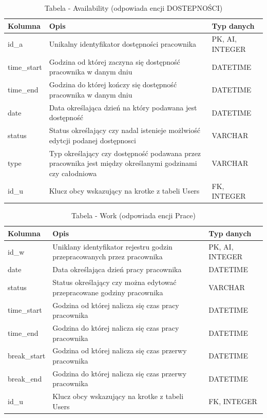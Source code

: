 \begin{table}[h!]
    \centering
    \begin{tabular}{|p{3cm}|p{6cm}|p{4cm}|}
    \hline
    \textbf{Kolumna} & \textbf{Opis} & \textbf{Typ danych} \\ \hline
    id\_a & Unikalny identyfikator dostępności pracownika & PK, AI, INTEGER \\ \hline
    time\_start & Godzina od której zaczyna się dostępność pracownika w danym dniu &  DATETIME\\ \hline
    time\_end & Godzina do której kończy się dostępność pracownika w danym dniu & DATETIME \\ \hline
    date & Data określająca dzień na który podawana jest dostępność  & DATETIME \\ \hline
    status & Status określający czy nadal istenieje możlwiość edytcji podanej dostępnosci & VARCHAR\\ \hline
    type & Typ określający czy dostępność podawana przez pracownika jest między określanymi godzinami czy całodniowa & VARCHAR \\ \hline
    id\_u & Klucz obcy wskazujący na krotke z tabeli Users & FK, INTEGER \\ \hline
    \end{tabular}
    \caption{Tabela - Availability (odpowiada encji DOSTEPNOŚCI)}
\end{table}

\begin{table}[h!]
    \centering
    \begin{tabular}{|p{3cm}|p{6cm}|p{4cm}|}
    \hline
    \textbf{Kolumna} & \textbf{Opis} & \textbf{Typ danych} \\ \hline
    id\_w & Uniklany identyfikator rejestru godzin przepracowanych przez pracownika &PK, AI, INTEGER \\ \hline
    date & Data określająca dzień pracy pracownika & DATETIME\\ \hline
    status & Status określający czy można edytować przepracowane godziny pracownika & VARCHAR\\ \hline
    time\_start & Godzina od której nalicza się czas pracy pracownika & DATETIME\\ \hline
    time\_end & Godzina do której nalicza się czas pracy pracownika & DATETIME \\ \hline
    break\_start & Godzina od której nalicza się czas przerwy pracownika & DATETIME \\ \hline
    break\_end &  Godzina do której nalicza się czas przerwy pracownika & DATETIME\\ \hline
    id\_u & Klucz obcy wskazujący na krotke z tabeli Users & FK, INTEGER \\ \hline
    \end{tabular}
    \caption{Tabela - Work (odpowiada encji Prace)}
\end{table}

